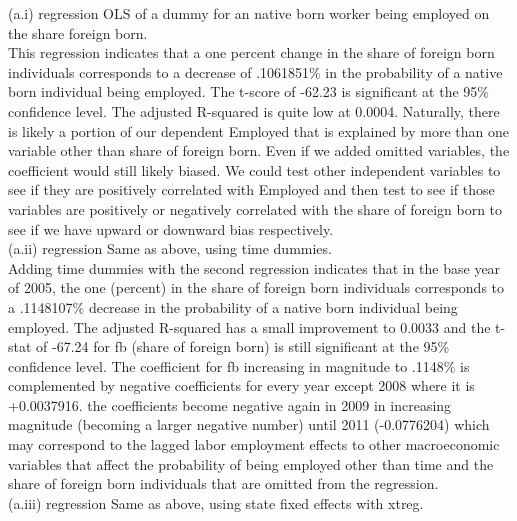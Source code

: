 \documentclass{article}
\begin{document}
\begin{enumerate}[label=\alph*]
(a.i) regression OLS of a dummy for an native born worker being employed on the share
foreign born.\\

This regression indicates that a one percent change in the share of foreign born individuals corresponds to a decrease of .1061851\% in the probability of a native born individual being employed. The t-score of -62.23 is significant at the 95\% confidence level. The adjusted R-squared is quite low at 0.0004. Naturally, there is likely a portion of our dependent Employed that is explained by more than one variable other than share of foreign born. Even if we added omitted variables, the coefficient would still likely biased. We could test other independent variables to see if they are positively correlated with Employed and then test to see if those variables are positively or negatively correlated with the share of foreign born to see if we have upward or downward bias respectively.\\

(a.ii) regression Same as above, using time dummies.\\

Adding time dummies with the second regression indicates that in the base year of 2005, the one (percent) in the share of foreign born individuals corresponds to a .1148107\% decrease in the probability of a native born individual being employed. The adjusted R-squared has a small improvement to 0.0033 and the t-stat of -67.24 for fb (share of foreign born) is still significant at the 95\% confidence level. The coefficient for fb increasing in magnitude to .1148\% is complemented by negative coefficients for every year except 2008 where it is +0.0037916. the coefficients become negative again in 2009 in increasing magnitude (becoming a larger negative number) until 2011 (-0.0776204) which may correspond to the lagged labor employment effects to other macroeconomic variables that affect the probability of being employed other than time and the share of foreign born individuals that are omitted from the regression.\\

(a.iii) regression Same as above, using state fixed effects with xtreg.\\


\end{enumerate}
\end{document}
